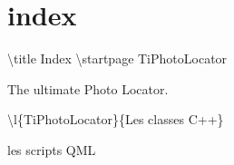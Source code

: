 \chapter{index}
\hypertarget{index}{}\label{index}
\textbackslash{}title Index \textbackslash{}startpage Ti\+Photo\+Locator

The ultimate Photo Locator. \begin{DoxyItemize}
\item \textbackslash{}l\{Ti\+Photo\+Locator\}\{Les classes C++\} \item les scripts QML \end{DoxyItemize}
